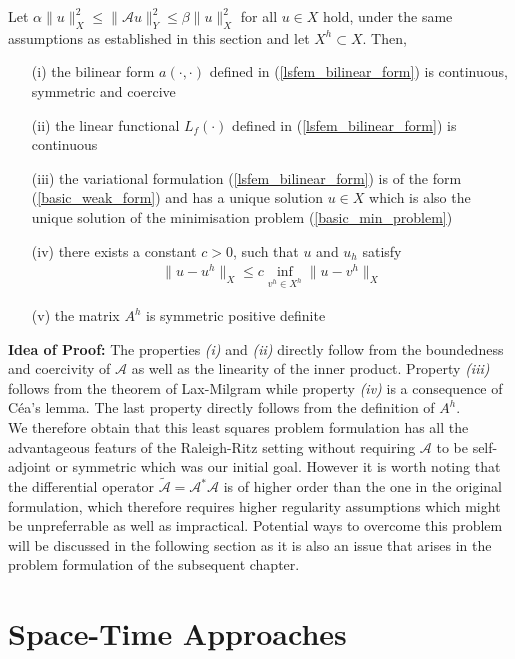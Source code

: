 \documentclass[../draft_1.tex]{subfiles}
\begin{document}
\begin{Theorem}
	Let $\alpha \| u \|_X^2 \leq \| \mathcal{A} u \|_Y^2 \leq \beta \| u \|_X^2$ for all $u \in X$ hold, under the same assumptions as established in this section and let $X^h \subset X$. Then, 
	\begin{itemize}
		\item[(i)] the bilinear form $a(\cdot, \cdot)$ defined in (\ref{lsfem_bilinear_form}) is continuous, symmetric and coercive
		\item[(ii)] the linear functional $L_f(\cdot)$ defined in (\ref{lsfem_bilinear_form}) is continuous
		\item[(iii)] the variational formulation (\ref{lsfem_bilinear_form}) is of the form (\ref{basic_weak_form}) and has a unique solution $u \in X$ which is also the unique solution of the minimisation problem (\ref{basic_min_problem})
		\item[(iv)] there exists a constant $c > 0$, such that $u$ and $u_h$ satisfy 
		\begin{align}
		\| u - u^h \|_X \leq c \inf_{v^h \in X^h} \| u - v^h\|_X
		\end{align}
	    \item[(v)]	the matrix $A^h$ is symmetric positive definite	
	\end{itemize}
\end{Theorem}

\textbf{Idea of Proof:} The properties \textit{(i)} and \textit{(ii)} directly follow from the boundedness and coercivity of $\mathcal{A}$ as well as the linearity of the inner product. Property \textit{(iii)} follows from the theorem of Lax-Milgram while property \textit{(iv)} is a consequence of C\'{e}a's lemma. The last property directly follows from the definition of $A^h$.
\smallskip
\\
We therefore obtain that this least squares problem formulation has all the advantageous featurs of the Raleigh-Ritz setting without requiring $\mathcal{A}$ to be self-adjoint or symmetric which was our initial goal. However it is worth noting that the differential operator $\tilde{\mathcal{A}} = \mathcal{A}^* \mathcal{A}$ is of higher order than the one in the original formulation, which therefore requires higher regularity assumptions which might be unpreferrable as well as impractical. Potential ways to overcome this problem will be discussed in the following section as it is also an issue that arises in the problem formulation of the subsequent chapter.

\section{Space-Time Approaches}
\end{document}
